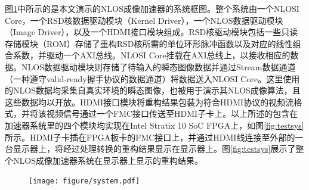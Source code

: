 \documentclass[master]{shtthesis}             %
\begin{document}
图\ref{fig:nlossys}中所示的是本文演示的NLOS成像加速器的系统框图。整个系统由一个NLOSI Core，一个RSD核数据驱动模块（Kernel Driver），一个NLOS数据驱动模块（Image Driver），以及一个HDMI接口模块组成。RSD核驱动模块包括一些只读存储模块（ROM）存储了重构RSD核所需的单位环形脉冲函数以及对应的线性组合系数，并驱动一个AXI总线。NLOSI Core挂载在AXI总线上，以接收相应的数据。NLOS数据驱动模块则存储了待输入的瞬态图像数据并通过Stream数据通道（一种遵守valid-ready握手协议的数据通道）将数据送入NLOSI Core。这里使用的NLOS数据均采集自真实环境的瞬态图像，也被\citet{Liu,Liu2019}用于演示其NLOS成像算法，且这些数据均以开放。HDMI接口模块将重构结果包装为符合HDMI协议的视频流格式，并将该视频信号通过一个FMC接口传送至HDMI子卡上。以上所述的包含在加速器系统里的四个模块均实现在Intel Stratix 10 SoC FPGA上，如图\ref{fig:testsys}所示。HDMI子卡插在FPGA板卡的FMC接口上，并通过HDMI线连接至外部的一台显示器上，将经过处理转换的重构结果显示在显示器上。图\ref{fig:testsys}展示了整个NLOS成像加速器系统在显示器上显示的重构结果。
\begin{table}[!t]
    \centering
    \label{tab:perf_comp}
\end{table}

\begin{figure}[!tb]
  \centering
  \texttt{[image: figure/system.pdf]}
  \label{fig:nlossys}
\end{figure}
\end{document}

